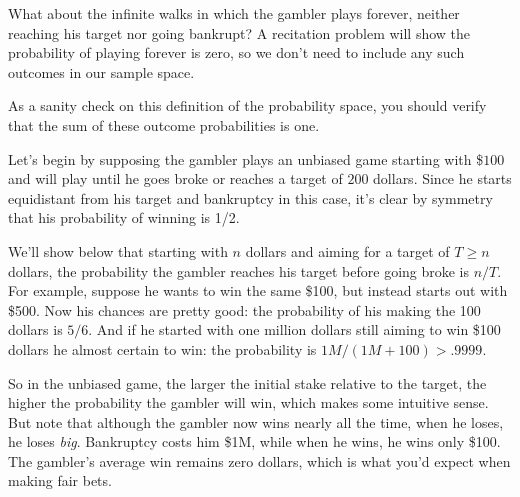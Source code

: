 \begin{editingnotes}
What about the infinite walks in which the gambler plays forever, neither
reaching his target nor going bankrupt?  A recitation problem will show the
probability of playing forever is zero, so we don't need to include any
such outcomes in our sample space.

As a sanity check on this definition of the probability space, you
should verify that the sum of these outcome probabilities is one.

\iffalse
To do this, we let $X$ be any string of $W$'s and $L$'s, and let $[X]$ be
the event consisting of the outcomes that begin with $X$.  If $X$ itself
is not an outcome but begins with an outcome, then $[X] = \emptyset$ so
$\prob{[X]} = 0$.  On the other hand, if no prefix of $X$ is an outcome,
then it's easy to verify by induction on $k$ that $\prob{[X]} = p^rq^{k-r}$.
length $k$
\fi

\end{editingnotes}



Let's begin by supposing the gambler plays an unbiased game starting
with \$$100$ and will play until he goes broke or reaches a target of
$200$ dollars.  Since he starts equidistant from his target and
bankruptcy in this case, it's clear by symmetry that his probability
of winning is 1/2.

We'll show below that starting with $n$ dollars and aiming for a
target of $T \geq n$ dollars, the probability the gambler reaches his
target before going broke is $n/T$.  For example, suppose he wants to
win the same \$100, but instead starts out with \$500.  Now his
chances are pretty good: the probability of his making the 100 dollars
is $5/6$.  And if he started with one million dollars still aiming to
win \$100 dollars he almost certain to win: the probability is $1M/(1M
+ 100) > .9999$.

So in the unbiased game, the larger the initial stake relative to the
target, the higher the probability the gambler will win, which makes
some intuitive sense.  But note that although the gambler now wins
nearly all the time, when he loses, he loses \emph{big}. Bankruptcy
costs him \$1M, while when he wins, he wins only \$100.  The gambler's
average win remains zero dollars, which is what you'd expect when
making fair bets.

